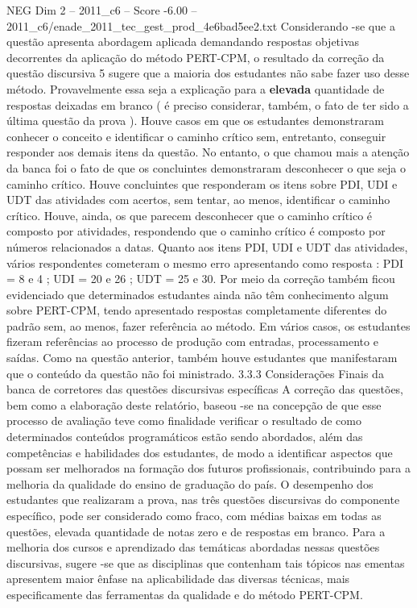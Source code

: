 \begin{textsample}{NEG Dim 2 – 2011\_c6 – Score -6.00 – 2011\_c6/enade\_2011\_tec\_gest\_prod\_4e6bad5ee2.txt}
Considerando -se que a questão apresenta abordagem aplicada demandando respostas objetivas decorrentes da aplicação do método PERT-CPM, o resultado da correção da questão discursiva 5 sugere que a maioria dos estudantes não sabe fazer uso desse método.
Provavelmente essa seja a explicação para a \textbf{elevada} quantidade de respostas deixadas em branco ( é preciso considerar, também, o fato de ter sido a última questão da prova ).
Houve casos em que os estudantes demonstraram conhecer o conceito e identificar o caminho crítico sem, entretanto, conseguir responder aos demais itens da questão.
No entanto, o que chamou mais a atenção da banca foi o fato de que os concluintes demonstraram desconhecer o que seja o caminho crítico.
Houve concluintes que responderam os itens sobre PDI, UDI e UDT das atividades com acertos, sem tentar, ao menos, identificar o caminho crítico.
Houve, ainda, os que parecem desconhecer que o caminho crítico é composto por atividades, respondendo que o caminho crítico é composto por números relacionados a datas.
Quanto aos itens PDI, UDI e UDT das atividades, vários respondentes cometeram o mesmo erro apresentando como resposta : PDI = 8 e 4 ; UDI = 20 e 26 ; UDT = 25 e 30.
Por meio da correção também ficou evidenciado que determinados estudantes ainda não têm conhecimento algum sobre PERT-CPM, tendo apresentado respostas completamente diferentes do padrão sem, ao menos, fazer referência ao método.
Em vários casos, os estudantes fizeram referências ao processo de produção com entradas, processamento e saídas.
Como na questão anterior, também houve estudantes que manifestaram que o conteúdo da questão não foi ministrado. 3.3.3 Considerações Finais da banca de corretores das questões discursivas específicas A correção das questões, bem como a elaboração deste relatório, baseou -se na concepção de que esse processo de avaliação teve como finalidade verificar o resultado de como determinados conteúdos programáticos estão sendo abordados, além das competências e habilidades dos estudantes, de modo a identificar aspectos que possam ser melhorados na formação dos futuros profissionais, contribuindo para a melhoria da qualidade do ensino de graduação do país.
O desempenho dos estudantes que realizaram a prova, nas três questões discursivas do componente específico, pode ser considerado como fraco, com médias baixas em todas as questões, elevada quantidade de notas zero e de respostas em branco.
Para a melhoria dos cursos e aprendizado das temáticas abordadas nessas questões discursivas, sugere -se que as disciplinas que contenham tais tópicos nas ementas apresentem maior ênfase na aplicabilidade das diversas técnicas, mais especificamente das ferramentas da qualidade e do método PERT-CPM.

\end{textsample}
